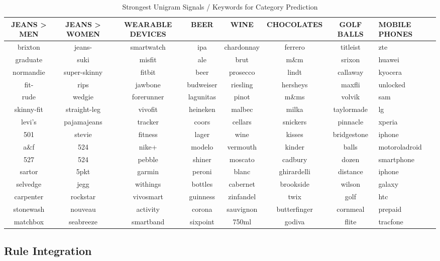 \begin{table}
  \caption{Strongest Unigram Signals / Keywords for Category Prediction}
  \label{tab:features}
  \begin{tabular}{cccccccl}
    \toprule
    JEANS > MEN	&	JEANS > WOMEN	&	WEARABLE DEVICES	&	 BEER	&	 WINE	&	CHOCOLATES	&	 GOLF BALLS	 & MOBILE PHONES \\
    \midrule
    brixton	&	jeans-	&	smartwatch	&	ipa	&	chardonnay	&	ferrero	&	titleist	&	zte	\\
    graduate	&	suki	&	misfit	&	ale	&	brut	&	m\&m	&	srixon	&	huawei	\\
    normandie	&	super-skinny	&	fitbit	&	beer	&	prosecco	&	lindt	&	callaway	&	kyocera	\\
    fit-	&	rips	&	jawbone	&	budweiser	&	riesling	&	hersheys	&	maxfli	&	unlocked	\\
    rude	&	wedgie	&	forerunner	&	lagunitas	&	pinot	&	m\&ms	&	volvik	&	sam	\\
    skinny-fit	&	straight-leg &	vivofit	&	heineken	&	malbec	&	milka	&	taylormade	&	lg	\\
    levi's\textregistered	&	pajamajeans	&	tracker	&	coors	&	cellars	&	snickers	&	pinnacle	&	xperia	\\
    501	&	stevie	&	fitness	&	lager	&	wine	&	kisses	&	bridgestone	&	iphone	\\
    a\&f	&	524\texttrademark	&	nike+	&	modelo	&	vermouth	&	kinder	&	balls	&	motoroladroid	\\
    527	&	524	&	pebble	&	shiner	&	moscato	&	cadbury	&	dozen	&	smartphone	\\
    sartor	&	5pkt	&	garmin	&	peroni	&	blanc	&	ghirardelli	&	distance	&	 iphone\textregistered	\\
    selvedge	&	jegg	&	withings	&	bottles	&	cabernet	&	brookside	&	wilson	&	galaxy	\\
    carpenter	&	rockstar	&	vivosmart	&	guinness	&	zinfandel	&	twix	&	golf	&	htc	\\
    stonewash	&	nouveau	&	activity	&	corona	&	sauvignon	&	butterfinger	&	cornmeal	&	prepaid	\\
    matchbox	&	seabreeze	&	smartband	&	sixpoint	&	750ml	&	godiva	&	flite	&	tracfone \\
    \bottomrule
  \end{tabular}
\end{table}


\subsection{Rule Integration} %
\label{sub:rule-integration}

